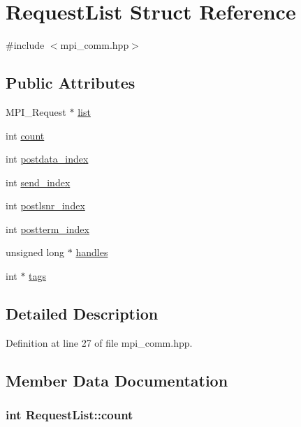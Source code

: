 \hypertarget{struct_request_list}{
\section{RequestList Struct Reference}
\label{struct_request_list}
}


{\ttfamily \#include $<$mpi\_\-comm.hpp$>$}\subsection*{Public Attributes}
\begin{DoxyCompactItemize}
\item 
MPI\_\-Request $\ast$ \hyperlink{struct_request_list_aa0fc1062a01a1aa73a508753d0494440}{list}
\item 
int \hyperlink{struct_request_list_aa32995711024a524c904a06555df2db5}{count}
\item 
int \hyperlink{struct_request_list_a5e3f719f39f59af21a9cf9bacd22d841}{postdata\_\-index}
\item 
int \hyperlink{struct_request_list_aa05550eb607c8e406ce218f8ed63eb60}{send\_\-index}
\item 
int \hyperlink{struct_request_list_ac88b4b8c36839d39d107391f6ff001b7}{postlsnr\_\-index}
\item 
int \hyperlink{struct_request_list_af44ba88ef3315eba9fdd58efcf4315d1}{postterm\_\-index}
\item 
unsigned long $\ast$ \hyperlink{struct_request_list_a3c4b479196e905405bfdc0d725f38e58}{handles}
\item 
int $\ast$ \hyperlink{struct_request_list_af55f665f201ed2b1579ce2493229ec31}{tags}
\end{DoxyCompactItemize}


\subsection{Detailed Description}


Definition at line 27 of file mpi\_\-comm.hpp.

\subsection{Member Data Documentation}
\hypertarget{struct_request_list_aa32995711024a524c904a06555df2db5}{
\subsubsection[{count}]{\setlength{\rightskip}{0pt plus 5cm}int {\bf RequestList::count}}}
\label{struct_request_list_aa32995711024a524c904a06555df2db5}


